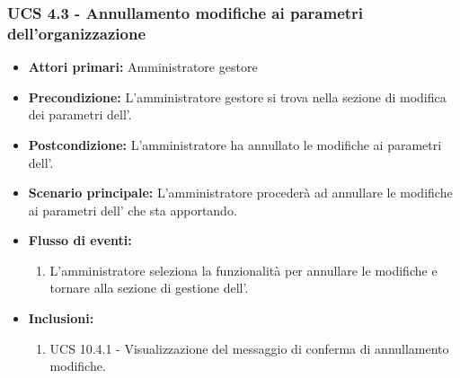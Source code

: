 \subsubsection{UCS 4.3 - Annullamento modifiche ai parametri dell'organizzazione}%
\begin{itemize}
\item \textbf{Attori primari:} Amministratore gestore
\item \textbf{Precondizione:} L'amministratore gestore si trova nella sezione di modifica dei parametri dell'.
\item \textbf{Postcondizione:} L'amministratore ha annullato le modifiche ai parametri dell'.
\item \textbf{Scenario principale:} L'amministratore procederà ad annullare le modifiche ai parametri dell' che sta apportando.
\item \textbf{Flusso di eventi:}
\begin{enumerate}
    \item L'amministratore seleziona la funzionalità per annullare le modifiche e tornare alla sezione di gestione dell'.
\end{enumerate}
\item \textbf{Inclusioni:}
\begin{enumerate}
    \item UCS 10.4.1 - Visualizzazione del messaggio di conferma di annullamento modifiche.
\end{enumerate}
\end{itemize}